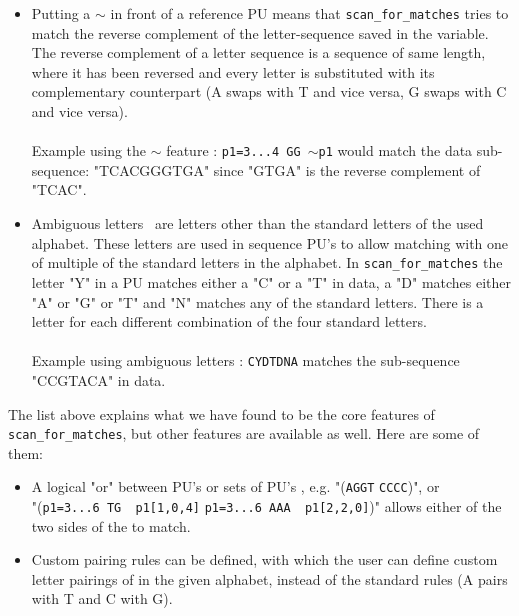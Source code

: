 \documentclass[12pt]{article}
\newcommand{\scm}{\texttt{scan\_for\_matches} }
\newcommand{\pu}{PU }
\newcommand{\pus}{PU's }
\begin{document}
\begin{itemize}
An example of each edit is shown in Figure 1. \\ \\
Example using single-letter edits : \texttt{p1=TGTGTCT[1,0,3]\; ATTCC[1,1,2]\; p1[2,2,2]} 
where the first sequence \pu is allowed 1 mismatch, 0
deletions and 3 insertions, the middle sequence \pu is allowed 1 mismatch, 1 deletion and 2 insertion 
and the reference \pu is allowed 2 of each.
\item Putting a $\sim$ in front of a reference \pu means that \scm tries to match the reverse 
complement of the letter-sequence saved in the variable. 
The reverse complement of a letter sequence is a sequence of same length, where it has been reversed and every letter
is substituted with its complementary counterpart (A swaps with T and vice versa, G swaps with C and vice versa).\\ \\
Example using the $\sim$ feature : \texttt{p1=3...4\; GG\; $\sim$p1} would match the data sub-sequence:
"TCACGGGTGA" since "GTGA" is the reverse complement of "TCAC".
\item Ambiguous letters~\cite{ambi} are letters other than the standard letters of the used alphabet. These letters are used
in sequence \pus to allow matching with one of multiple of the standard letters in the alphabet.
In \scm the letter "Y" in a \pu matches either a "C" or a "T" in data, a "D" matches either "A" or "G" or "T" 
and "N" matches any of the standard letters. There is a letter for each different combination of the
four standard letters. \\ \\
Example using ambiguous letters : \texttt{CYDTDNA} matches the sub-sequence "CCGTACA" in data.
\end{itemize}
The list above explains what we have found to be the core features of \texttt{scan\_for\_matches}, 
but other features are available as well. Here are some of them: 
\begin{itemize}
\item A logical "or" between \pus or sets of \pus, e.g. "(\texttt{AGGT} \text{\textbar} \texttt{CCCC})", or  \\
"(\texttt{p1=3...6 TG ~p1[1,0,4]} \text{\textbar} \texttt{p1=3...6 AAA ~p1[2,2,0]})"
allows either of the two sides of the \text{\textbar} to match.
\item Custom pairing rules can be defined, with which the user can define custom letter pairings of in the given
alphabet, instead of the standard rules (A pairs with T and C with G). \\
\end{itemize}
\end{document}
